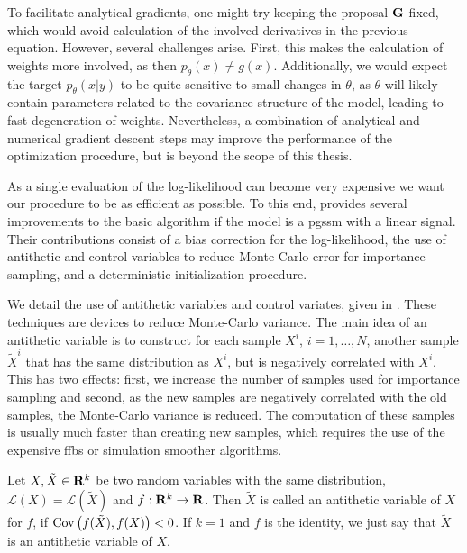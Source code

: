To facilitate analytical gradients, one might try keeping the proposal $\mathbf G$ fixed, which would avoid calculation of the involved derivatives in the previous equation. However, several challenges arise. First, this makes the calculation of weights more involved, as then $p_{\theta}(x) \neq g(x)$. Additionally, we would expect the target $p_{\theta}(x|y)$ to be quite sensitive to small changes in $\theta$, as $\theta$ will likely contain parameters related to the covariance structure of the model, leading to fast degeneration of weights. Nevertheless, a combination of analytical and numerical gradient descent steps may improve the performance of the optimization procedure, but is beyond the scope of this thesis.

As a single evaluation of the log-likelihood can become very expensive we want our procedure to be as efficient as possible. To this end, \citep{Durbin1997Monte} provides several improvements to the basic algorithm if the model is a \gls{pgssm} with a linear signal. Their contributions consist of a bias correction for the log-likelihood, the use of antithetic and control variables to reduce Monte-Carlo error for importance sampling, and a deterministic initialization procedure.

We detail the use of antithetic variables and control variates, given in \citep{Durbin1997Monte}. These techniques are devices to reduce Monte-Carlo variance. The main idea of an antithetic variable is to construct for each sample $X^{i}$, $i = 1,\dots, N$, another sample $\tilde X^{i}$ that has the same distribution as $X^{i}$, but is negatively correlated with $X^{i}$. This has two effects: first, we increase the number of samples used for importance sampling and second, as the new samples are negatively correlated with the old samples, the Monte-Carlo variance is reduced. The computation of these samples is usually much faster than creating new samples, which requires the use of the expensive \gls{ffbs} or simulation smoother algorithms. 
\begin{definition}
    Let $X, \tilde X\in\mathbf R^{k}$ be two random variables with the same distribution, $\mathcal L (X) = \mathcal L(\tilde X)$ and $f: \mathbf R^{k} \to \mathbf R$. Then $\tilde X$ is called an antithetic variable of $X$ for $f$, if $\operatorname{Cov} \left( f(\tilde X), f(X) \right) < 0$. If $k = 1$ and $f$ is the identity, we just say that $\tilde X$ is an antithetic variable of $X$.
\end{definition}

